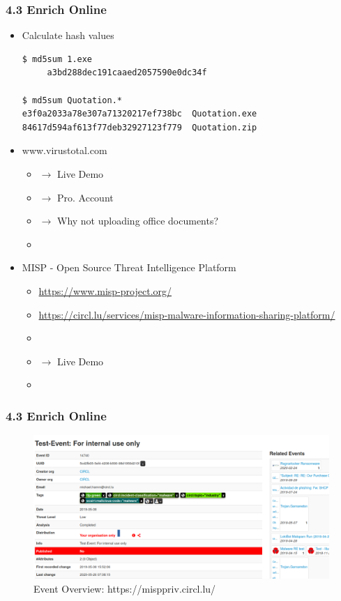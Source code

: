 \begin{frame}[fragile]
  \frametitle{4.3 Enrich Online}
    \begin{itemize}
        \item Calculate hash values
  \begin{lstlisting}[basicstyle=\tiny]
$ md5sum 1.exe 
     a3bd288dec191caaed2057590e0dc34f

$ md5sum Quotation.*
e3f0a2033a78e307a71320217ef738bc  Quotation.exe
84617d594af613f77deb32927123f779  Quotation.zip

  \end{lstlisting}
        \item www.virustotal.com
        \begin{itemize}
	    \item[] $\to$ Live Demo
	    \item[] $\to$ Pro. Account
	    \item[] $\to$ Why not uploading office documents?
	    \item[]
        \end{itemize}
        \item MISP - Open Source Threat Intelligence Platform
        \begin{itemize}
		\item[] \url{https://www.misp-project.org/}
		\item[] \url{https://circl.lu/services/misp-malware-information-sharing-platform/}
	    \item[]
	    \item[] $\to$ Live Demo
	    \item[]
        \end{itemize}
    \end{itemize}
\end{frame}


\begin{frame}[fragile]
  \frametitle{4.3 Enrich Online}
    \begin{figure}
        \includegraphics[scale=0.25]{images/misp_1.png}
        \captionsetup{labelformat=empty,labelsep=none}
        \caption[]{\tiny Event Overview: https://misppriv.circl.lu/}
    \end{figure}
\end{frame}


